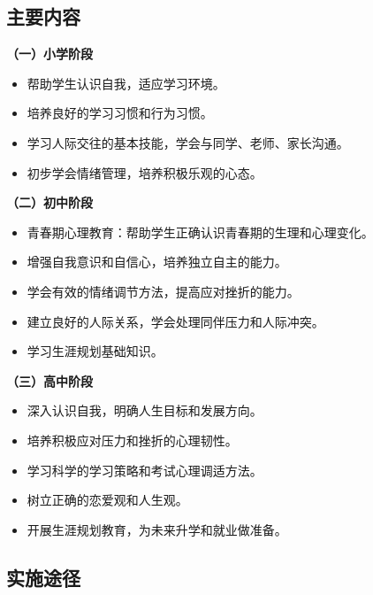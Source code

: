 \subsection{主要内容}

\begin{keybox}
\textbf{（一）小学阶段}

\begin{itemize}[leftmargin=*]
    \item 帮助学生认识自我，适应学习环境。
    \item 培养良好的学习习惯和行为习惯。
    \item 学习人际交往的基本技能，学会与同学、老师、家长沟通。
    \item 初步学会情绪管理，培养积极乐观的心态。
\end{itemize}

\textbf{（二）初中阶段}

\begin{itemize}[leftmargin=*]
    \item 青春期心理教育：帮助学生正确认识青春期的生理和心理变化。
    \item 增强自我意识和自信心，培养独立自主的能力。
    \item 学会有效的情绪调节方法，提高应对挫折的能力。
    \item 建立良好的人际关系，学会处理同伴压力和人际冲突。
    \item 学习生涯规划基础知识。
\end{itemize}

\textbf{（三）高中阶段}

\begin{itemize}[leftmargin=*]
    \item 深入认识自我，明确人生目标和发展方向。
    \item 培养积极应对压力和挫折的心理韧性。
    \item 学习科学的学习策略和考试心理调适方法。
    \item 树立正确的恋爱观和人生观。
    \item 开展生涯规划教育，为未来升学和就业做准备。
\end{itemize}
\end{keybox}

\subsection{实施途径}


